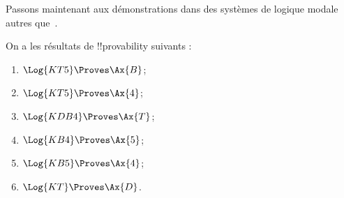 \documentclass[../../../include/open-logic-section]{subfiles}
\begin{document}


Passons maintenant aux démonstrations dans des systèmes de logique
modale autres que~.

\begin{prop}
On a les résultats de !!{provability} suivants :
  \begin{enumerate}
  \item $\Log{KT5} \Proves \Ax{B}$;
  \item $\Log{KT5} \Proves \Ax{4}$;
  \item $\Log{KDB4} \Proves \Ax{T}$;
  \item $\Log{KB4} \Proves \Ax{5}$;
  \item $\Log{KB5} \Proves \Ax{4}$;
  \item {}$\Log{KT} \Proves \Ax{D}$.
  \end{enumerate}
\end{prop}
\end{document}
